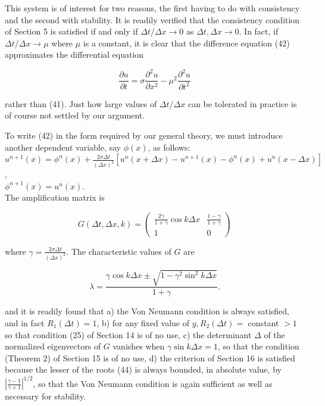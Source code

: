 \documentclass[10pt]{article}
\begin{document}
This system is of interest for two reasons, the first having to do with consistency and the second with stability. It is readily verified that the consistency condition of Section 5 is satisfied if and only if \(\Delta t / \Delta x \rightarrow 0\) as \(\Delta t, \Delta x \rightarrow 0\). In fact, if \(\Delta t / \Delta x \rightarrow \mu\) where \(\mu\) is a constant, it is clear that the difference equation (42) approximates the differential equation

\[
\frac{\partial u}{\partial t}=\sigma \frac{\partial^{2} u}{\partial x^{2}}-\mu^{2} \frac{\partial^{2} u}{\partial t^{2}}
\]

rather than (41). Just how large values of \(\Delta t / \Delta x\) can be tolerated in practice is of course not settled by our argument.

To write (42) in the form required by our general theory, we must introduce another dependent variable, say \(\phi(x)\), as follows:\\
\(u^{n+1}(x)=\phi^{n}(x)+\frac{2 \sigma \Delta t}{(\Delta x)^{2}}\left[u^{n}(x+\Delta x)-u^{n+1}(x)-\phi^{n}(x)+u^{n}(x-\Delta x)\right]\),\\
\(\phi^{n+1}(x)=u^{n}(x)\).\\
The amplification matrix is

\[
G(\Delta t, \Delta x, k)=\left(\begin{array}{cc}
\frac{2 \gamma}{1+\gamma} \cos k \Delta x & \frac{1-\gamma}{1+\gamma} \\
1 & 0
\end{array}\right)
\]

where \(\gamma=\frac{2 \sigma \Delta t}{(\Delta x)^{2}}\). The characteristic values of \(G\) are

\[
\lambda=\frac{\gamma \cos k \Delta x \pm \sqrt{1-\gamma^{2} \sin ^{2} k \Delta x}}{1+\gamma} .
\]

and it is readily found that a) the Von Neumann condition is always satisfied, and in fact \(R_{1}(\Delta t)=1\), b) for any fixed value of \(y, R_{2}(\Delta t)=\) constant \(>1\) so that condition (25) of Section 14 is of no use, c) the determinant \(\Delta\) of the normalized eigenvectors of \(G\) vanishes when \(\gamma \sin k \Delta x=1\), so that the condition (Theorem 2) of Section 15 is of no use, d) the criterion of Section 16 is satisfied because the lesser of the roots (44) is always bounded, in absolute value, by \(\left|\frac{\gamma-1}{\gamma+1}\right|^{1 / 2}\), so that the Von Neumann condition is again sufficient as well as necessary for stability.
\end{document}
